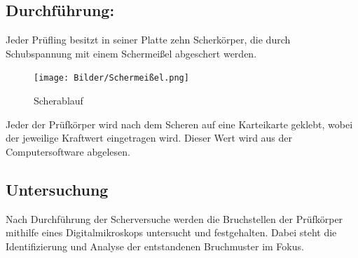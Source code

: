 \subsection{Durchführung:}
Jeder Prüfling besitzt in seiner Platte zehn Scherkörper, die durch Schubspannung mit einem Schermeißel abgeschert werden.
\vspace{0.1cm}
\begin{figure}[h]
    \centering
    \texttt{[image: Bilder/Schermeißel.png]}
    \caption{Scherablauf}
    \vspace{0.2cm}
    \label{Abb.4: Scherablauf}
\end{figure}
\vspace{0.1cm}
Jeder der Prüfkörper wird nach dem Scheren auf eine Karteikarte geklebt, wobei der jeweilige Kraftwert eingetragen wird.
Dieser Wert wird aus der Computersoftware abgelesen.
\subsection{Untersuchung}
Nach Durchführung der Scherversuche werden die Bruchstellen der Prüfkörper mithilfe eines Digitalmikroskops untersucht und festgehalten.
Dabei steht die Identifizierung und Analyse der entstandenen Bruchmuster im Fokus.